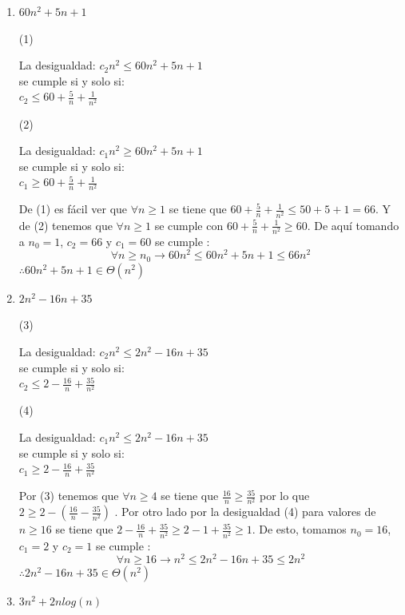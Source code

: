 \documentclass{article}
\begin{document}
\begin{enumerate}
    \item $60n^2 + 5n +1$ \\
    \begin{multicols}{2}
    \begin{center}(1) \end{center}
    La desigualdad: $c_2  n^2 \leq 60n^2 + 5n +1 $ \\
         se cumple si y solo si: \\
         $c_2 \leq 60 + \frac{5}{n} + \frac{1}{n^2}$ 
    \columnbreak
     \begin{center}(2) \end{center}
    La desigualdad: $c_1  n^2 \geq 60n^2 + 5n +1 $ \\
         se cumple si y solo si: \\
         $c_1 \geq 60 + \frac{5}{n} + \frac{1}{n^2}$ 
    \end{multicols}
    De (1) es fácil ver que $\forall n \geq 1$ se tiene que $ 60 + \frac{5}{n} + \frac{1}{n^2} \leq 50+5+1 = 66$. Y de (2) tenemos que $\forall n \geq 1$ se cumple con $60 + \frac{5}{n} + \frac{1}{n^2} \geq 60$. De aquí tomando a $n_0 =1$, $c_2= 66$ y $c_1 = 60$ se cumple :
    \[\forall n \geq n_0 \rightarrow 60n^2 \leq 60n^2 + 5n +1 \leq 66n^2 \]
    $\therefore 60n^2 + 5n +1 \in \Theta(n^2)$
    
    \item $2n^2 -16n +35$
    \begin{multicols}{2}
    \begin{center}(3) \end{center}
     La desigualdad: $c_2  n^2 \leq  2n^2 -16n +35$ \\
         se cumple si y solo si: \\
         $c_2 \leq 2 - \frac{16}{n} + \frac{35}{n^2}$ 
    \columnbreak
     \begin{center}(4) \end{center}
    La desigualdad: $c_1  n^2 \leq  2n^2 -16n +35$ \\
         se cumple si y solo si: \\
         $c_1 \geq 2 - \frac{16}{n} + \frac{35}{n^2}$ 
    \end{multicols}
    Por (3) tenemos que  $\forall n \geq 4$ se tiene que $\frac{16}{n} \geq \frac{35}{n^2}$ por lo que $2 \geq 2 -(\frac{16}{n} - \frac{35}{n^2})$ .
    Por otro lado por la desigualdad (4) para valores de $n \geq 16$ se tiene que $2 - \frac{16}{n} + \frac{35}{n^2} \geq 2-1+\frac{35}{n^2} \geq 1$.
    De esto, tomamos $n_0 = 16$, $c_1 = 2$ y $c_2 = 1$  se cumple :
    \[\forall n \geq 16 \rightarrow n^2 \leq 2n^2 -16n +35 \leq 2  n^2 \]
    $\therefore2n^2 -16n +35\in \Theta(n^2)$
    \item $3n^2 + 2  n log(n) $\\
    

\end{enumerate}
\end{document}
